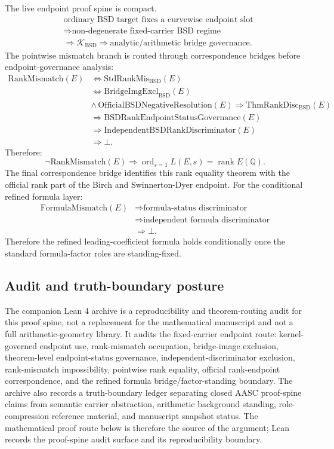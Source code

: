 \documentclass[11pt]{article}
\newcommand{\Q}{\mathbb{Q}}
\newcommand{\rank}{\operatorname{rank}}
\newcommand{\ord}{\operatorname{ord}}
\newcommand{\BSD}{\mathrm{BSD}}
\newcommand{\RankMismatch}{\mathrm{RankMismatch}}
\newcommand{\StdRankMis}{\mathrm{StdRankMis}_{\BSD}}
\newcommand{\BridgeImgExcl}{\mathrm{BridgeImgExcl}_{\BSD}}
\newcommand{\ThmRankDisc}{\mathrm{ThmRankDisc}_{\BSD}}
\newcommand{\FormulaMismatch}{\mathrm{FormulaMismatch}}
\newcommand{\Kern}{\mathcal{K}}
\begin{document}
The live endpoint proof spine is compact.
\[
\begin{aligned}
&\text{ordinary BSD target fixes a curvewise endpoint slot}\\
&\Rightarrow \text{non-degenerate fixed-carrier BSD regime}\\
&\Rightarrow \Kern_{\BSD}
\Rightarrow \text{analytic/arithmetic bridge governance}.
\end{aligned}
\]
The pointwise mismatch branch is routed through correspondence bridges before endpoint-governance analysis:
\[
\begin{aligned}
\RankMismatch(E)
&\Longleftrightarrow \StdRankMis(E)\\
&\Longleftrightarrow \BridgeImgExcl(E)\\
&\wedge\,\mathrm{OfficialBSDNegativeResolution}(E)\Rightarrow \ThmRankDisc(E)\\
&\Rightarrow \mathrm{BSDRankEndpointStatusGovernance}(E)\\
&\Rightarrow \mathrm{IndependentBSDRankDiscriminator}(E)\\
&\Rightarrow \bot.
\end{aligned}
\]
Therefore:
\[
\neg\RankMismatch(E)
\Rightarrow
\ord_{s=1}L(E,s)=\rank E(\Q).
\]
The final correspondence bridge identifies this rank equality theorem with the official rank part of the Birch and Swinnerton-Dyer endpoint.
For the conditional refined formula layer:
\[
\begin{aligned}
\FormulaMismatch(E)
&\Rightarrow \text{formula-status discriminator}\\
&\Rightarrow \text{independent formula discriminator}\\
&\Rightarrow \bot.
\end{aligned}
\]
Therefore the refined leading-coefficient formula holds conditionally once the standard formula-factor roles are standing-fixed.

\subsection*{Audit and truth-boundary posture}
The companion Lean 4 archive is a reproducibility and theorem-routing audit for this proof spine, not a replacement for the mathematical manuscript and not a full arithmetic-geometry library. It audits the fixed-carrier endpoint route: kernel-governed endpoint use, rank-mismatch occupation, bridge-image exclusion, theorem-level endpoint-status governance, independent-discriminator exclusion, rank-mismatch impossibility, pointwise rank equality, official rank-endpoint correspondence, and the refined formula bridge/factor-standing boundary. The archive also records a truth-boundary ledger separating closed AASC proof-spine claims from semantic carrier abstraction, arithmetic background standing, role-compression reference material, and manuscript snapshot status. The mathematical proof route below is therefore the source of the argument; Lean records the proof-spine audit surface and its reproducibility boundary.
\end{document}
